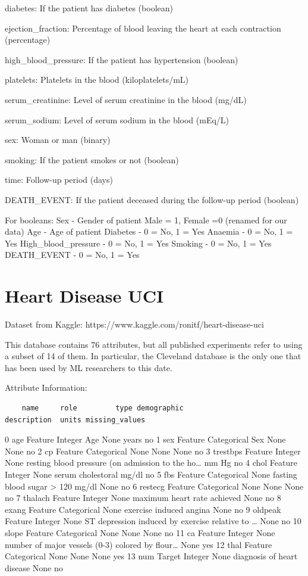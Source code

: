 \documentclass[
  letterpaper,
]{krantz}
\begin{document}
diabetes: If the patient has diabetes (boolean)

ejection\_fraction: Percentage of blood leaving the heart at each
contraction (percentage)

high\_blood\_pressure: If the patient has hypertension (boolean)

platelets: Platelets in the blood (kiloplatelets/mL)

serum\_creatinine: Level of serum creatinine in the blood (mg/dL)

serum\_sodium: Level of serum sodium in the blood (mEq/L)

sex: Woman or man (binary)

smoking: If the patient smokes or not (boolean)

time: Follow-up period (days)

DEATH\_EVENT: If the patient deceased during the follow-up period
(boolean)

For booleans: Sex - Gender of patient Male = 1, Female =0 (renamed for
our data) Age - Age of patient Diabetes - 0 = No, 1 = Yes Anaemia - 0 =
No, 1 = Yes High\_blood\_pressure - 0 = No, 1 = Yes Smoking - 0 = No, 1
= Yes DEATH\_EVENT - 0 = No, 1 = Yes

\section{Heart Disease UCI}\label{sec-dd-heart-disease-uci}

Dataset from Kaggle: https://www.kaggle.com/ronitf/heart-disease-uci

This database contains 76 attributes, but all published experiments
refer to using a subset of 14 of them. In particular, the Cleveland
database is the only one that has been used by ML researchers to this
date.

Attribute Information:

\begin{verbatim}
    name     role         type demographic                                        description  units missing_values
\end{verbatim}

0 age Feature Integer Age None years no 1 sex Feature Categorical Sex
None None no 2 cp Feature Categorical None None None no 3 trestbps
Feature Integer None resting blood pressure (on admission to the
ho\ldots{} mm Hg no 4 chol Feature Integer None serum cholestoral mg/dl
no 5 fbs Feature Categorical None fasting blood sugar \textgreater{} 120
mg/dl None no 6 restecg Feature Categorical None None None no 7 thalach
Feature Integer None maximum heart rate achieved None no 8 exang Feature
Categorical None exercise induced angina None no 9 oldpeak Feature
Integer None ST depression induced by exercise relative to \ldots{} None
no 10 slope Feature Categorical None None None no 11 ca Feature Integer
None number of major vessels (0-3) colored by flour\ldots{} None yes 12
thal Feature Categorical None None None yes 13 num Target Integer None
diagnosis of heart disease None no
\end{document}
